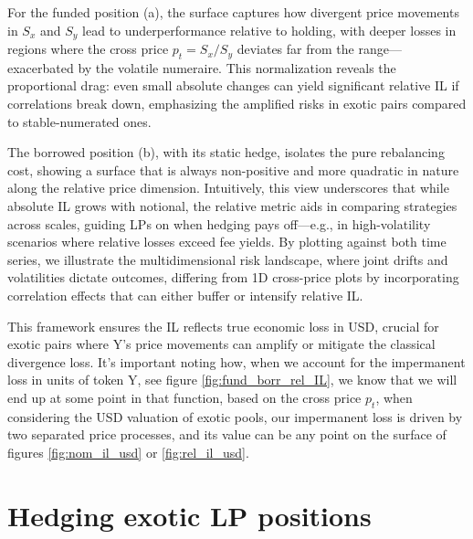 \documentclass{article}
\begin{document}
For the funded position (a), the surface captures how divergent price movements in $S_x$ and $S_y$ lead to underperformance relative to holding, with deeper losses in regions where the cross price $p_t = S_x / S_y$ deviates far from the range—exacerbated by the volatile numeraire. This normalization reveals the proportional drag: even small absolute changes can yield significant relative IL if correlations break down, emphasizing the amplified risks in exotic pairs compared to stable-numerated ones.

The borrowed position (b), with its static hedge, isolates the pure rebalancing cost, showing a surface that is always non-positive and more quadratic in nature along the relative price dimension. Intuitively, this view underscores that while absolute IL grows with notional, the relative metric aids in comparing strategies across scales, guiding LPs on when hedging pays off—e.g., in high-volatility scenarios where relative losses exceed fee yields. By plotting against both time series, we illustrate the multidimensional risk landscape, where joint drifts and volatilities dictate outcomes, differing from 1D cross-price plots by incorporating correlation effects that can either buffer or intensify relative IL.

This framework ensures the IL reflects true economic loss in USD, crucial for exotic pairs where Y's price movements can amplify or mitigate the classical divergence loss. \newline
 It's important noting how, when we account for the impermanent loss in units of token Y, see figure \ref{fig:fund_borr_rel_IL}, we know that we will end up at some point in that function, based on the cross price $p_t$, when considering the USD valuation of exotic pools, our impermanent loss is driven by two separated price processes, and its value can be any point on the surface of figures \ref{fig:nom_il_usd} or \ref{fig:rel_il_usd}.

\newpage

\section{Hedging exotic LP positions}
\end{document}
